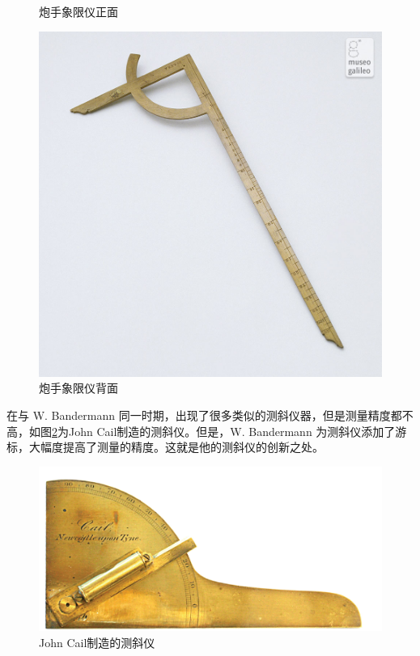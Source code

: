 \documentclass[UTF8]{ctexart}
\begin{document}
\begin{figure}[h]
\begin{minipage}[t]{0.28\textwidth}
        \caption{炮手象限仪正面}
        \label{fig:gunner's_quadrant_front}
    \end{minipage}
    \begin{minipage}[t]{0.28\textwidth}
        \centering
        \includegraphics[width=1.0\textwidth]{img/gunners_quadrant_back.jpg}
        \caption{炮手象限仪背面}
        \label{fig:gunner's_quadrant_back}
    \end{minipage}
\end{figure}

在与 W. Bandermann 同一时期，出现了很多类似的测斜仪器，但是测量精度都不高，如图\ref{fig:John_Cail_clinometer}为John Cail制造的测斜仪\cite{Society1983}。但是，W. Bandermann 为测斜仪添加了游标，大幅度提高了测量的精度。这就是他的测斜仪的创新之处。

\begin{figure}[h]
    \centering
    \begin{minipage}[t]{0.4\textwidth}
        \centering
        \includegraphics[width=1.0\textwidth]{img/John_Cail_clinometer.png}
        \caption{John Cail制造的测斜仪}
        \label{fig:John_Cail_clinometer}
    \end{minipage}
\end{figure}
\end{document}
